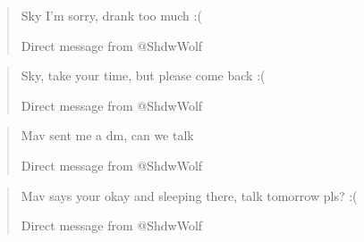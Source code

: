\secdiv

\begin{quotation}
  Sky I'm sorry, drank too much :(

  Direct message from @ShdwWolf
\end{quotation}

\secdiv

\begin{quotation}
  Sky, take your time, but please come back :(

  Direct message from @ShdwWolf
\end{quotation}

\secdiv

\begin{quotation}
  Mav sent me a dm, can we talk

  Direct message from @ShdwWolf
\end{quotation}

\secdiv

\begin{quotation}
  Mav says your okay and sleeping there, talk tomorrow pls? :(

  Direct message from @ShdwWolf
\end{quotation}
